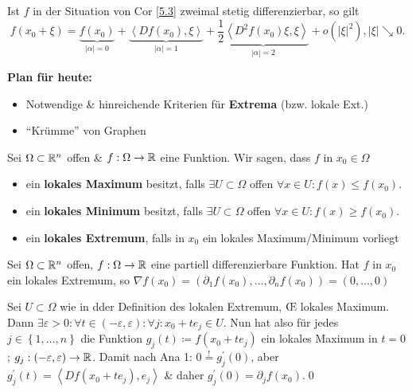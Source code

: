 \begin{note}
	Ist $ f $ in der Situation von Cor \ref{5.3} zweimal stetig differenzierbar, so gilt
	\[
		f(x_0 + \xi) = \underbrace{f(x_0)}_{\left| \alpha \right| = 0} + \underbrace{\left< Df(x_0), \xi \right>}_{\left| \alpha \right| = 1} + \underbrace{\frac{ 1 }{ 2 } \left< D^2 f(x_0) \xi, \xi \right> }_{\left| \alpha \right| = 2} + o \left( \left| \xi \right| ^2 \right) , \left| \xi \right| \searrow 0.
	\]
	
\end{note}

\textbf{Plan für heute:}
\begin{itemize}
        \item Notwendige \& hinreichende Kriterien für \textbf{Extrema} (bzw. lokale Ext.)
        \item ``Krümme'' von Graphen
\end{itemize}

\begin{definition}
        Sei $ \Omega \subset \mathbb{R} ^n $ offen \& $ f : \Omega \to \mathbb{R}  $ eine Funktion.
        Wir sagen, dass $ f $ in $ x_0 \in \Omega $
        \begin{itemize}
                \item ein \textbf{lokales Maximum} besitzt, falls $ \exists U \subset  \Omega $ offen $ \forall x \in U : f(x) \leq f(x_0) $.
                \item ein \textbf{lokales Minimum} besitzt, falls $ \exists U \subset  \Omega $ offen $ \forall x \in U : f(x) \geq f(x_0) $.
                \item ein \textbf{lokales Extremum}, falls in $ x_0 $ ein lokales Maximum/Minimum vorliegt
        \end{itemize}

\end{definition}

\begin{theorem}
        Sei $ \Omega \subset \mathbb{R} ^n $ offen, $ f: \Omega \to \mathbb{R}  $ eine partiell differenzierbare Funktion.
        Hat $ f $ in $ x_0 $ ein lokales Extremum, so $ \nabla f (x_0) = \left( \partial_1 f(x_0), \dotsc, \partial_n f(x_0) \right) = (0, \dotsc, 0) $
\end{theorem}
\begin{proof*}
        Sei $ U \subset \Omega $ wie in dder Definition des lokalen Extremum, \OE{} lokales Maximum.
        Dann $ \exists  \varepsilon > 0 : \forall t \in \left( -\varepsilon , \varepsilon  \right) : \forall j : x_0 + t e_j \in U $.
        Nun hat also für jedes $ j \in \left\{ 1, \dotsc, n \right\}  $ die Funktion $ g_j (t) \coloneqq f(x_0 + t e_j) $ ein lokales Maximum in $ t = 0 $;
        $ g_j : \left( -\varepsilon , \varepsilon  \right) \to \mathbb{R}  $.
        Damit nach Ana 1: $ 0 \overset{!}{=}g_j^\prime (0) $, aber $ g_j^\prime (t) = \left< D f(x_0 + te_j), e_j \right>  $ \& daher $ g_j^\prime (0) = \partial_j f(x_0) $.\qed
\end{proof*}

